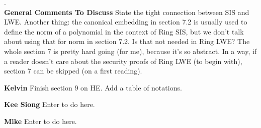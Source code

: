 \documentclass[8pt]{extarticle}
\begin{document}
\begin{outline}[]
.\\
\hrulefill 
\0 {\bf {\large General Comments To Discuss}}
    \1 State the tight connection between SIS and LWE.
    \1 Another thing: the canonical embedding in section 7.2 is usually used to define the norm of a polynomial in the context of Ring SIS, but we don’t talk about using that for norm in section 7.2. Is that not needed in Ring LWE?
    \1 The whole section 7 is pretty hard going (for me), because it’s so abstract. In a way, if a reader doesn’t care about the security proofs of Ring LWE (to begin with), section 7 can be skipped (on a first reading).

  
\hrulefill 
\0 {\bf {\large Kelvin}}
    \1 Finish section 9 on HE.
    \1 Add a table of notations. 
    
    
%

	


\hrulefill 
\0 {\bf {\large Kee Siong}}
    \1 Enter to do here. 
    
\hrulefill 
\0 {\bf {\large Mike}}
    \1 Enter to do here. 
   

\end{outline}
\end{document}
